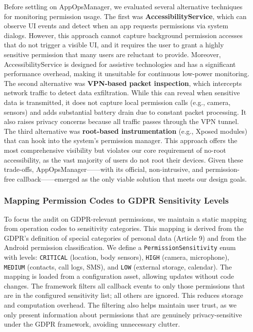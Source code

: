 Before settling on AppOpsManager, we evaluated several alternative techniques for monitoring permission usage. The first was \textbf{AccessibilityService}, which can observe UI events and detect when an app requests permissions via system dialogs. However, this approach cannot capture background permission accesses that do not trigger a visible UI, and it requires the user to grant a highly sensitive permission that many users are reluctant to provide. Moreover, AccessibilityService is designed for assistive technologies and has a significant performance overhead, making it unsuitable for continuous low-power monitoring. The second alternative was \textbf{VPN-based packet inspection}, which intercepts network traffic to detect data exfiltration. While this can reveal when sensitive data is transmitted, it does not capture local permission calls (e.g., camera, sensors) and adds substantial battery drain due to constant packet processing. It also raises privacy concerns because all traffic passes through the VPN tunnel. The third alternative was \textbf{root-based instrumentation} (e.g., Xposed modules) that can hook into the system's permission manager. This approach offers the most comprehensive visibility but violates our core requirement of no-root accessibility, as the vast majority of users do not root their devices. Given these trade-offs, AppOpsManager——with its official, non-intrusive, and permission-free callback——emerged as the only viable solution that meets our design goals.

\subsubsection{Mapping Permission Codes to GDPR Sensitivity Levels}

To focus the audit on GDPR-relevant permissions, we maintain a static mapping from operation codes to sensitivity categories. This mapping is derived from the GDPR's definition of special categories of personal data (Article 9) and from the Android permission classification. We define a \texttt{PermissionSensitivity} enum with levels: \texttt{CRITICAL} (location, body sensors), \texttt{HIGH} (camera, microphone), \texttt{MEDIUM} (contacts, call logs, SMS), and \texttt{LOW} (external storage, calendar). The mapping is loaded from a configuration asset, allowing updates without code changes. The framework filters all callback events to only those permissions that are in the configured sensitivity list; all others are ignored. This reduces storage and computation overhead. The filtering also helps maintain user trust, as we only present information about permissions that are genuinely privacy-sensitive under the GDPR framework, avoiding unnecessary clutter.

